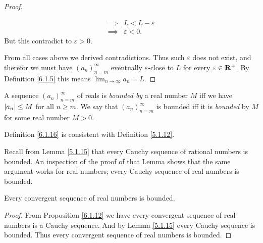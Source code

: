 \begin{proof}
\begin{itemize}
\begin{align*}
                  \implies & L < L - \varepsilon                                                                   \\
                  \implies & \varepsilon < 0.
              \end{align*}
              But this contradict to \(\varepsilon > 0\).
    \end{itemize}
    From all cases above we derived contradictions.
    Thus such \(\varepsilon\) does not exist, and therefor we must have \((a_n)_{n = m}^\infty\) eventually \(\varepsilon\)-close to \(L\) for every \(\varepsilon \in \mathbf{R}^+\).
    By Definition \ref{6.1.5} this means \(\lim_{n \to \infty} a_n = L\).
\end{proof}

\begin{definition}\label{6.1.16}
    A sequence \((a_n)_{n = m}^\infty\) of reals is \emph{bounded by} a real number \(M\) iff we have \(\left\lvert a_n\right\rvert \leq M\) for all \(n \geq m\).
    We say that \((a_n)_{n = m}^\infty\) is bounded iff it is \emph{bounded} by \(M\) for some real number \(M > 0\).
\end{definition}

\begin{note}
    Definition \ref{6.1.16} is consistent with Definition \ref{5.1.12}.
\end{note}

\begin{note}
    Recall from Lemma \ref{5.1.15} that every Cauchy sequence of rational numbers is bounded.
    An inspection of the proof of that Lemma shows that the same argument works for real numbers;
    every Cauchy sequence of real numbers is bounded.
\end{note}

\begin{corollary}\label{6.1.17}
    Every convergent sequence of real numbers is bounded.
\end{corollary}

\begin{proof}
    From Proposition \ref{6.1.12} we have every convergent sequence of real numbers is a Cauchy sequence.
    And by Lemma \ref{5.1.15} every Cauchy sequence is bounded.
    Thus every convergent sequence of real numbers is bounded.
\end{proof}

